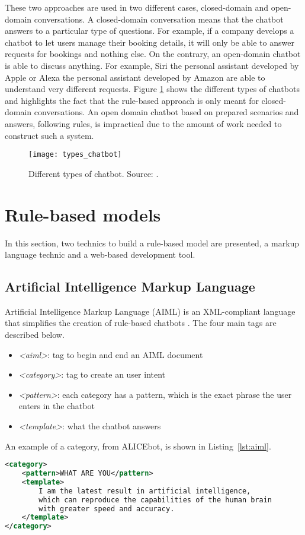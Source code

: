 These two approaches are used in two different cases, closed-domain and open-domain conversations. A closed-domain conversation means that the chatbot answers to a particular type of questions. For example, if a company develops a chatbot to let users manage their booking details, it will only be able to answer requests for bookings and nothing else. On the contrary, an open-domain chatbot is able to discuss anything. For example, Siri the personal assistant developed by Apple or Alexa the personal assistant developed by Amazon are able to understand very different requests. Figure \ref{fig:types_chatbot} shows the different types of chatbots and highlights the fact that the rule-based approach is only meant for closed-domain conversations. An open domain chatbot based on prepared scenarios and answers, following rules, is impractical due to the amount of work needed to construct such a system.

\begin{figure}
    \centering
    \texttt{[image: types\_chatbot]}
    \decoRule
    \caption[Different types of chatbot]{Different types of chatbot. Source: \citet{types-chatbot}.}
    \label{fig:types_chatbot}
\end{figure}

\section{Rule-based models}
In this section, two technics to build a rule-based model are presented, a markup language technic and a web-based development tool.

\subsection{Artificial Intelligence Markup Language}
Artificial Intelligence Markup Language (AIML) is an XML-compliant language that simplifies the creation of rule-based chatbots \citep{wallace2005aiml}. The four main tags are described below.
\begin{itemize}
    \item \textit{<aiml>}: tag to begin and end an AIML document
    \item \textit{<category>}: tag to create an user intent
    \item \textit{<pattern>}: each category has a pattern, which is the exact phrase the user enters in the chatbot
    \item \textit{<template>}: what the chatbot answers
\end{itemize}
An example of a category, from ALICEbot, is shown in Listing~\ref{lst:aiml}.
\begin{lstlisting}[language=XML, label={lst:aiml}]
<category>
    <pattern>WHAT ARE YOU</pattern>
    <template>
        I am the latest result in artificial intelligence,
        which can reproduce the capabilities of the human brain
        with greater speed and accuracy.
    </template>
</category>
\end{lstlisting}

